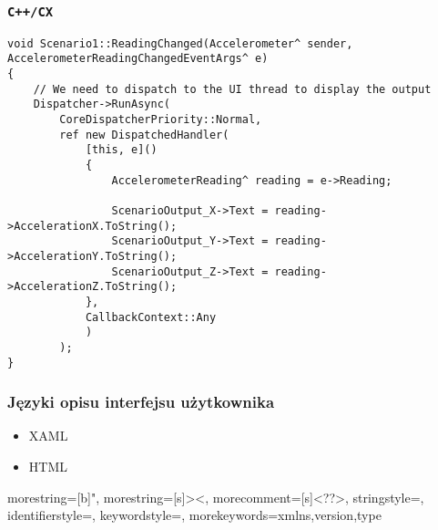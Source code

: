 \begin{frame}[fragile]
\frametitle{\texttt{C++/CX}}
\begin{adjustbox}{width=\textwidth}
\begin{lstlisting}
void Scenario1::ReadingChanged(Accelerometer^ sender, AccelerometerReadingChangedEventArgs^ e) 
{ 
    // We need to dispatch to the UI thread to display the output 
    Dispatcher->RunAsync( 
        CoreDispatcherPriority::Normal, 
        ref new DispatchedHandler( 
            [this, e]() 
            { 
                AccelerometerReading^ reading = e->Reading; 
 
                ScenarioOutput_X->Text = reading->AccelerationX.ToString(); 
                ScenarioOutput_Y->Text = reading->AccelerationY.ToString(); 
                ScenarioOutput_Z->Text = reading->AccelerationZ.ToString(); 
            }, 
            CallbackContext::Any 
            ) 
        ); 
} 
\end{lstlisting}
\end{adjustbox}

\end{frame}

\begin{frame}
\frametitle{Języki opisu interfejsu użytkownika}
\begin{itemize}
\item	XAML
\item	HTML
\end{itemize}
\end{frame}



{
  morestring=[b]",
  morestring=[s]{>}{<},
  morecomment=[s]{<?}{?>},
  stringstyle=\color{black},
  identifierstyle=\color{darkblue},
  keywordstyle=\color{cyan},
  morekeywords={xmlns,version,type}%
}


